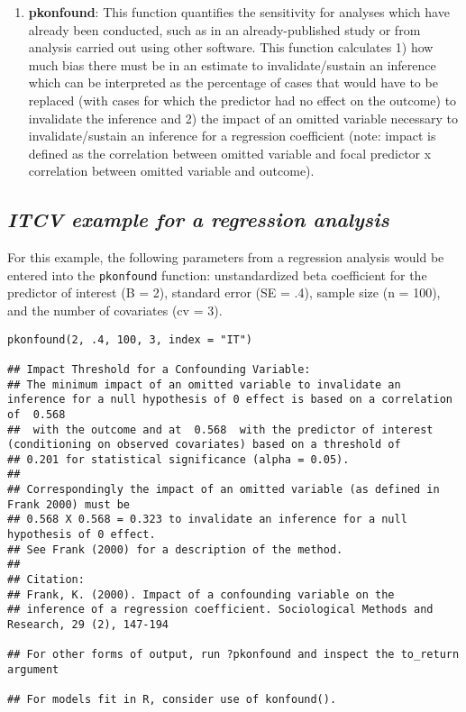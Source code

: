 \documentclass[
]{article}
\providecommand{\tightlist}{%
  \setlength{\itemsep}{0pt}\setlength{\parskip}{0pt}}
\begin{document}
\begin{enumerate}
\def\labelenumi{\arabic{enumi}.}
\setcounter{enumi}{1}
\tightlist
\item
  \textbf{pkonfound}: This function quantifies the sensitivity for
  analyses which have already been conducted, such as in an
  already-published study or from analysis carried out using other
  software. This function calculates 1) how much bias there must be in
  an estimate to invalidate/sustain an inference which can be
  interpreted as the percentage of cases that would have to be replaced
  (with cases for which the predictor had no effect on the outcome) to
  invalidate the inference and 2) the impact of an omitted variable
  necessary to invalidate/sustain an inference for a regression
  coefficient (note: impact is defined as the correlation between
  omitted variable and focal predictor x correlation between omitted
  variable and outcome).
\end{enumerate}

\hypertarget{itcv-example-for-a-regression-analysis}{%
\subsection{\texorpdfstring{\emph{ITCV example for a regression
analysis}}{ITCV example for a regression analysis}}\label{itcv-example-for-a-regression-analysis}}

For this example, the following parameters from a regression analysis
would be entered into the \texttt{pkonfound} function: unstandardized
beta coefficient for the predictor of interest (B = 2), standard error
(SE = .4), sample size (n = 100), and the number of covariates (cv = 3).

\begin{verbatim}
pkonfound(2, .4, 100, 3, index = "IT")

## Impact Threshold for a Confounding Variable:
## The minimum impact of an omitted variable to invalidate an inference for a null hypothesis of 0 effect is based on a correlation of  0.568
##  with the outcome and at  0.568  with the predictor of interest (conditioning on observed covariates) based on a threshold of 
## 0.201 for statistical significance (alpha = 0.05).
## 
## Correspondingly the impact of an omitted variable (as defined in Frank 2000) must be 
## 0.568 X 0.568 = 0.323 to invalidate an inference for a null hypothesis of 0 effect.
## See Frank (2000) for a description of the method.
## 
## Citation:
## Frank, K. (2000). Impact of a confounding variable on the
## inference of a regression coefficient. Sociological Methods and Research, 29 (2), 147-194

## For other forms of output, run ?pkonfound and inspect the to_return argument

## For models fit in R, consider use of konfound().
\end{verbatim}
\end{document}
